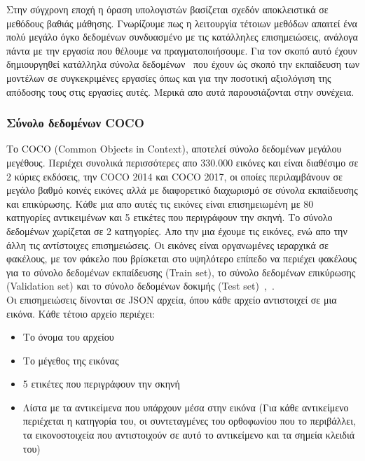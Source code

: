\documentclass[12pt]{article}
\numberwithin{equation}{section}
\begin{document}
Στην σύγχρονη εποχή η όραση υπολογιστών βασίζεται σχεδόν αποκλειστικά σε μεθόδους βαθιάς μάθησης. Γνωρίζουμε πως η λειτουργία τέτοιων μεθόδων απαιτεί ένα πολύ μεγάλο όγκο δεδομένων συνδυασμένο με τις κατάλληλες επισημειώσεις, ανάλογα πάντα με την εργασία που θέλουμε να πραγματοποιήσουμε. Για τον σκοπό αυτό έχουν δημιουργηθεί κατάλληλα σύνολα δεδομένων~\cite{article2} που έχουν ώς σκοπό την εκπαίδευση των μοντέλων σε συγκεκριμένες εργασίες όπως και για την ποσοτική αξιολόγιση της απόδοσης τους στις εργασίες αυτές. Μερικά απο αυτά παρουσιάζονται στην συνέχεια.

\subsubsection{Σύνολο δεδομένων COCO}

Το COCO (Common Objects in Context), αποτελεί σύνολο δεδομένων μεγάλου μεγέθους. Περιέχει συνολικά περισσότερες απο 330.000 εικόνες και είναι διαθέσιμο σε 2 κύριες εκδόσεις, την COCO 2014 και COCO 2017, οι οποίες περιλαμβάνουν σε μεγάλο βαθμό κοινές εικόνες αλλά με διαφορετικό διαχωρισμό σε σύνολα εκπαίδευσης και επικύρωσης. Κάθε μια απο αυτές τις εικόνες είναι επισημειωμένη με 80 κατηγορίες αντικειμένων και 5 ετικέτες που περιγράφουν την σκηνή. Το σύνολο δεδομένων χωρίζεται σε 2 κατηγορίες. Απο την μια έχουμε τις εικόνες, ενώ απο την άλλη τις αντίστοιχες επισημειώσεις. Οι εικόνες είναι  οργανωμένες ιεραρχικά σε φακέλους, με τον φάκελο που βρίσκεται στο υψηλότερο επίπεδο να περιέχει φακέλους για το σύνολο δεδομένων εκπαίδευσης (Train set), το σύνολο δεδομένων επικύρωσης (Validation set) και το σύνολο δεδομένων δοκιμής (Test set)~\cite{lin2015microsoftcococommonobjects},~\cite{shah2023coco}.  \\

Οι επισημειώσεις δίνονται σε JSON αρχεία, όπου κάθε αρχείο αντιστοιχεί σε μια εικόνα. Κάθε τέτοιο αρχείο περιέχει: \\

\begin{itemize}
    \item Το όνομα του αρχείου
    \item Το μέγεθος της εικόνας
    \item 5 ετικέτες που περιγράφουν την σκηνή
     \item Λίστα με τα αντικείμενα που υπάρχουν μέσα στην εικόνα (Για κάθε αντικείμενο περιέχεται η κατηγορία του, οι συντεταγμένες του ορθοφωνίου που το περιβάλλει, τα εικονοστοιχεία που αντιστοιχούν σε αυτό το αντικείμενο και τα σημεία κλειδιά του)
\end{itemize}
\end{document}

